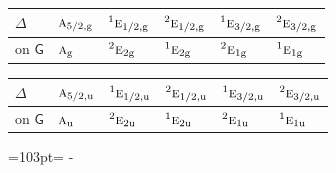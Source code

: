 \documentclass[10pt,a4paper]{article}
\newcommand{\needspace}[1]{\par\penalty-100\begingroup\dimen0=#1\relax\dimen2=\pagegoal
  \advance\dimen2-\pagetotal\ifdim\dimen0>\dimen2\relax\ifdim\dimen2>0pt\vfil\break\fi\fi
  \endgroup}
\numberwithin{equation}{section}
\newcommand{\grp}[1]{\mathsf{#1}}
\newcommand{\irr}[1]{\text{\normalfont\scshape #1}}
\newcommand{\conjpair}[1]{{}^{#1}}
\newcommand{\ptag}[1]{\mathrm{#1}}
\begin{document}
\begin{center}\begin{tabular}{@{}llllll@{}}\toprule
$\Delta$ & $\irr{a}_{5/2,\ptag{g}}$ & $\conjpair{1}\irr{e}_{1/2,\ptag{g}}$ & $\conjpair{2}\irr{e}_{1/2,\ptag{g}}$ & $\conjpair{1}\irr{e}_{3/2,\ptag{g}}$ & $\conjpair{2}\irr{e}_{3/2,\ptag{g}}$\\\midrule
on $\grp{G}$ & $\irr{a}_{\ptag{g}}$ & $\conjpair{2}\irr{e}_{2\ptag{g}}$ & $\conjpair{1}\irr{e}_{2\ptag{g}}$ & $\conjpair{2}\irr{e}_{1\ptag{g}}$ & $\conjpair{1}\irr{e}_{1\ptag{g}}$\\
\bottomrule\end{tabular}\end{center}
\begin{center}\begin{tabular}{@{}llllll@{}}\toprule
$\Delta$ & $\irr{a}_{5/2,\ptag{u}}$ & $\conjpair{1}\irr{e}_{1/2,\ptag{u}}$ & $\conjpair{2}\irr{e}_{1/2,\ptag{u}}$ & $\conjpair{1}\irr{e}_{3/2,\ptag{u}}$ & $\conjpair{2}\irr{e}_{3/2,\ptag{u}}$\\\midrule
on $\grp{G}$ & $\irr{a}_{\ptag{u}}$ & $\conjpair{2}\irr{e}_{2\ptag{u}}$ & $\conjpair{1}\irr{e}_{2\ptag{u}}$ & $\conjpair{2}\irr{e}_{1\ptag{u}}$ & $\conjpair{1}\irr{e}_{1\ptag{u}}$\\
\bottomrule\end{tabular}\end{center}
\needspace{103pt}
\end{document}
